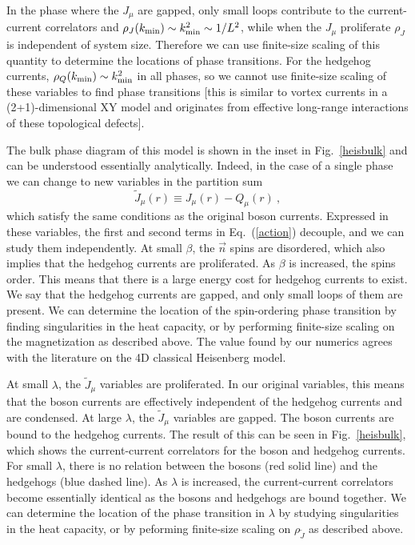 \documentclass[prb,twocolumn]{revtex4-1}
\begin{document}
In the phase where the $J_\mu$ are gapped, only small loops contribute to the current-current correlators and $\rho_J(k_{\rm min})\sim {k}_{\rm min}^2 \sim 1/L^2$, while when the $J_\mu$ proliferate $\rho_J$ is independent of system size. Therefore we can use finite-size scaling of this quantity to determine the locations of phase transitions. For the hedgehog currents, $\rho_Q(k_{\rm min})\sim {k}_{\rm min}^2$ in all phases, so we cannot use finite-size scaling of these variables to find phase transitions [this is similar to vortex currents in a (2+1)-dimensional XY model and originates from effective long-range interactions of these topological defects]. 

The bulk phase diagram of this model is shown in the inset in Fig.~\ref{heisbulk} and can be understood essentially analytically.  Indeed, in the case of a single phase we can change to new variables in the partition sum
\begin{equation}
\tilde J_\mu(r) \equiv J_\mu(r) - Q_\mu(r) ~,
\label{shift}
\end{equation}
which satisfy the same conditions as the original boson currents.  Expressed in these variables, the first and second terms in Eq.~(\ref{action}) decouple, and we can study them independently. 
At small $\beta$, the $\vec{n}$ spins are disordered, which also implies that the hedgehog currents are proliferated. As $\beta$ is increased, the spins order. This means that there is a large energy cost for hedgehog currents to exist. We say that the hedgehog currents are gapped, and only small loops of them are present. We can determine the location of the spin-ordering phase transition by finding singularities in the heat capacity, or by performing finite-size scaling on the magnetization as described above. The value found by our numerics agrees with the literature on the 4D classical Heisenberg model.\cite{McKenzie2} %

At small $\lambda$, the $\tilde J_\mu$ variables are proliferated. In our original variables, this means that the boson currents are effectively independent of the hedgehog currents and are condensed. At large $\lambda$, the $\tilde J_\mu$ variables are gapped. The boson currents are bound to the hedgehog currents. The result of this can be seen in Fig.~\ref{heisbulk}, which shows the current-current correlators for the boson and hedgehog currents. For small $\lambda$, there is no relation between the bosons (red solid line) and the hedgehogs (blue dashed line). As $\lambda$ is increased, the current-current correlators become essentially identical as the bosons and hedgehogs are bound together. We can determine the location of the phase transition in $\lambda$ by studying singularities in the heat capacity, or by peforming finite-size scaling on $\rho_{\tilde J}$ as described above. 
\end{document}
